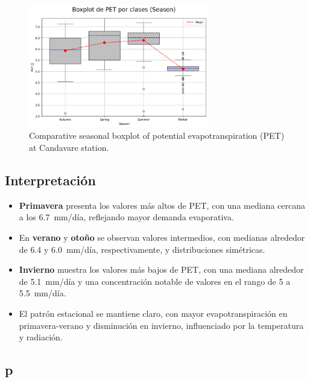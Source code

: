 \vspace{0.2cm}

\begin{figure}[htbp]
\centering
\includegraphics[width=0.7\textwidth]{resultados/por_estacion_del_anio/boxplot_clases_por_estacion/Candavare/PET_ClassBoxplot_Season.png}
\caption{Comparative seasonal boxplot of potential evapotranspiration (PET) at Candavare station.}
\label{fig:candavare_pet_box}
\end{figure}

\subsection*{Interpretación}

\begin{itemize}
    \item \textbf{Primavera} presenta los valores más altos de PET, con una mediana cercana a los 6.7~mm/día, reflejando mayor demanda evaporativa.
    \item En \textbf{verano} y \textbf{otoño} se observan valores intermedios, con medianas alrededor de 6.4 y 6.0~mm/día, respectivamente, y distribuciones simétricas.
    \item \textbf{Invierno} muestra los valores más bajos de PET, con una mediana alrededor de 5.1~mm/día y una concentración notable de valores en el rango de 5 a 5.5~mm/día.
    \item El patrón estacional se mantiene claro, con mayor evapotranspiración en primavera-verano y disminución en invierno, influenciado por la temperatura y radiación.
\end{itemize}


\subsection{\gls{p} }

